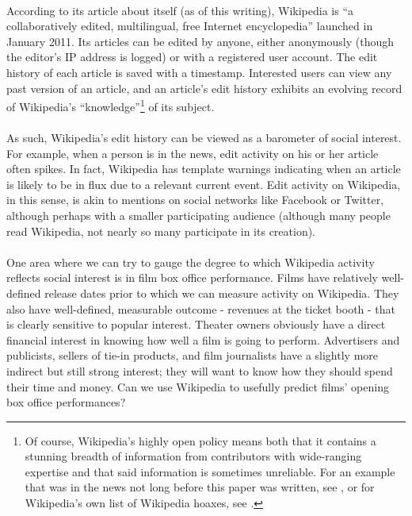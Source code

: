 \documentclass[10pt]{article}
\begin{document}
    \paragraph{}
    According to its article about itself (as of this writing), Wikipedia is ``a collaboratively edited, multilingual, free Internet encyclopedia'' launched in January 2011. \cite{bib:wikipedia} Its articles can be edited by anyone, either anonymously (though the editor's IP address is logged) or with a registered user account. The edit history of each article is saved with a timestamp. Interested users can view any past version of an article, and an article's edit history exhibits an evolving record of Wikipedia's ``knowledge''\footnote{Of course, Wikipedia's highly open policy means both that it contains a stunning breadth of information from contributors with wide-ranging expertise and that said information is sometimes unreliable. For an example that was in the news not long before this paper was written, see \cite{bib:bicholm}, or for Wikipedia's own list of Wikipedia hoaxes, see \cite{bib:wikipedia-hoaxes}.} of its subject. 
    
    \paragraph{}
    As such, Wikipedia's edit history can be viewed as a barometer of social interest. For example, when a person is in the news, edit activity on his or her article often spikes. In fact, Wikipedia has template warnings indicating when an article is likely to be in flux due to a relevant current event. Edit activity on Wikipedia, in this sense, is akin to mentions on social networks like Facebook or Twitter, although perhaps with a smaller participating audience (although many people read Wikipedia, not nearly so many participate in its creation). 
    
    \paragraph{}
    One area where we can try to gauge the degree to which Wikipedia activity reflects social interest is in film box office performance. Films have relatively well-defined release dates prior to which we can measure activity on Wikipedia. They also have well-defined, measurable outcome - revenues at the ticket booth - that is clearly sensitive to popular interest. Theater owners obviously have a direct financial interest in knowing how well a film is going to perform. Advertisers and publicists, sellers of tie-in products, and film journalists have a slightly more indirect but still strong interest; they will want to know how they should spend their time and money. Can we use Wikipedia to usefully predict films' opening box office performances? 
    
\end{document}
